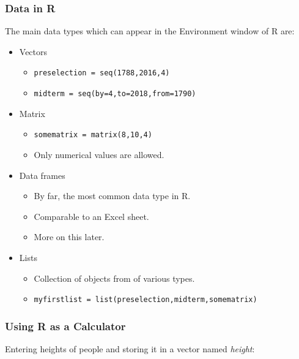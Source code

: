 \documentclass[
]{article}
\providecommand{\tightlist}{%
  \setlength{\itemsep}{0pt}\setlength{\parskip}{0pt}}
\begin{document}
\hypertarget{data-in-r}{%
\subsubsection{Data in R}\label{data-in-r}}

The main data types which can appear in the Environment window of R are:

\begin{itemize}
\tightlist
\item
  Vectors

  \begin{itemize}
  \tightlist
  \item
    \texttt{preselection\ =\ seq(1788,2016,4)}
  \item
    \texttt{midterm\ =\ seq(by=4,to=2018,from=1790)}
  \end{itemize}
\item
  Matrix

  \begin{itemize}
  \tightlist
  \item
    \texttt{somematrix\ =\ matrix(8,10,4)}
  \item
    Only numerical values are allowed.
  \end{itemize}
\item
  Data frames

  \begin{itemize}
  \tightlist
  \item
    By far, the most common data type in R.
  \item
    Comparable to an Excel sheet.
  \item
    More on this later.
  \end{itemize}
\item
  Lists

  \begin{itemize}
  \tightlist
  \item
    Collection of objects from of various types.
  \item
    \texttt{myfirstlist\ =\ list(preselection,midterm,somematrix)}
  \end{itemize}
\end{itemize}

\hypertarget{using-r-as-a-calculator}{%
\subsubsection{Using R as a Calculator}\label{using-r-as-a-calculator}}

Entering heights of people and storing it in a vector named \emph{height}:
\end{document}
